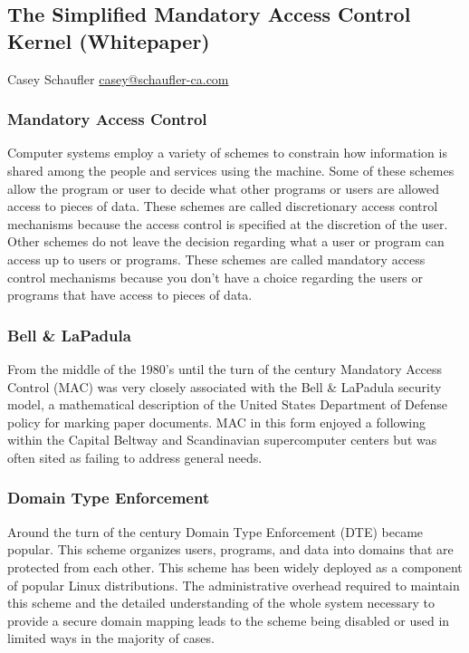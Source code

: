 \documentclass[a4paper,8pt,english]{sphinxmanual}
\begin{document}
\subsection{The Simplified Mandatory Access Control Kernel (Whitepaper)}
\label{admin-guide/LSM/Smack:the-simplified-mandatory-access-control-kernel-whitepaper}
Casey Schaufler
\href{mailto:casey@schaufler-ca.com}{casey@schaufler-ca.com}


\subsubsection{Mandatory Access Control}
\label{admin-guide/LSM/Smack:mandatory-access-control}
Computer systems employ a variety of schemes to constrain how information is
shared among the people and services using the machine. Some of these schemes
allow the program or user to decide what other programs or users are allowed
access to pieces of data. These schemes are called discretionary access
control mechanisms because the access control is specified at the discretion
of the user. Other schemes do not leave the decision regarding what a user or
program can access up to users or programs. These schemes are called mandatory
access control mechanisms because you don't have a choice regarding the users
or programs that have access to pieces of data.


\subsubsection{Bell \& LaPadula}
\label{admin-guide/LSM/Smack:bell-lapadula}
From the middle of the 1980's until the turn of the century Mandatory Access
Control (MAC) was very closely associated with the Bell \& LaPadula security
model, a mathematical description of the United States Department of Defense
policy for marking paper documents. MAC in this form enjoyed a following
within the Capital Beltway and Scandinavian supercomputer centers but was
often sited as failing to address general needs.


\subsubsection{Domain Type Enforcement}
\label{admin-guide/LSM/Smack:domain-type-enforcement}
Around the turn of the century Domain Type Enforcement (DTE) became popular.
This scheme organizes users, programs, and data into domains that are
protected from each other. This scheme has been widely deployed as a component
of popular Linux distributions. The administrative overhead required to
maintain this scheme and the detailed understanding of the whole system
necessary to provide a secure domain mapping leads to the scheme being
disabled or used in limited ways in the majority of cases.
\end{document}
